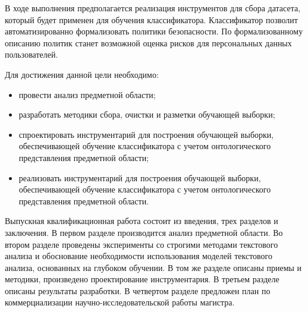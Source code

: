 \documentclass[../main]{subfiles}
\begin{document}
В ходе выполнения предполагается реализация инструментов для сбора датасета, который будет применен для обучения классификатора. Классификатор позволит автоматизированно формализовать политики безопасности. По формализованному описанию политик станет возможной оценка рисков для персональных данных пользователей.

Для достижения данной цели необходимо:

\begin{itemize}
    \item провести анализ предметной области;
    \item разработать методики сбора, очистки и разметки обучающей выборки;
    \item спроектировать инструментарий для построения обучающей выборки, обеспечивающей обучение классификатора с учетом онтологического представления предметной области;
    \item реализовать  инструментарий для построения обучающей выборки, обеспечивающей обучение классификатора с учетом онтологического представления предметной области.
\end{itemize}

Выпускная  квалификационная  работа  состоит  из  введения, трех разделов и заключения. В первом разделе производится анализ предметной области. Во втором разделе проведены эксперименты со строгими методами текстового анализа и обоснование необходимости использования моделей текстового анализа, основанных на глубоком обучении. В том же разделе описаны приемы и методики, произведено проектирование инструментария. В третьем разделе описаны результаты разработки. В четвертом разделе предложен план по коммерциализации научно-исследовательской работы магистра.
\end{document}
